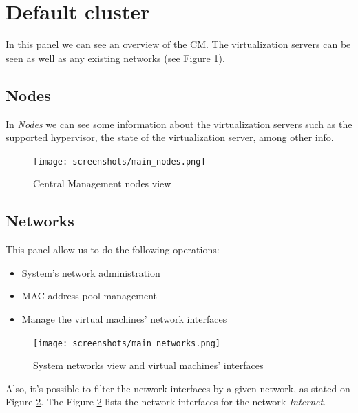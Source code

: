\pagebreak

\section{Default cluster}

In this panel we can see an overview of the CM. The virtualization servers can be seen as well as any existing networks (see Figure \ref{fig:main_nodes}).

\subsection{Nodes}
\label{sub:nodes}

In \emph{Nodes} we can see some information about the virtualization servers such as the supported hypervisor, the state of the virtualization server, among other info.

\begin{figure}[H]
	\begin{center}
	\texttt{[image: screenshots/main\_nodes.png]}
	\caption{Central Management nodes view}
	\label{fig:main_nodes}
	\end{center}
\end{figure}

\subsection{Networks}
\label{sub:network}

This panel allow us to do the following operations:

\begin{itemize}
    \item System's network administration
    \item MAC address pool management
    \item Manage the virtual machines' network interfaces
\end{itemize}

\begin{figure}[H]
	\begin{center}
	\texttt{[image: screenshots/main\_networks.png]}
	\caption{System networks view and virtual machines' interfaces}
	\label{fig:main_networks}
	\end{center}
\end{figure}

Also, it's possible to filter the network interfaces by a given network, as stated on Figure \ref{fig:main_networks}.
The Figure \ref{fig:main_networks} lists the network interfaces for the network \emph{Internet}.

